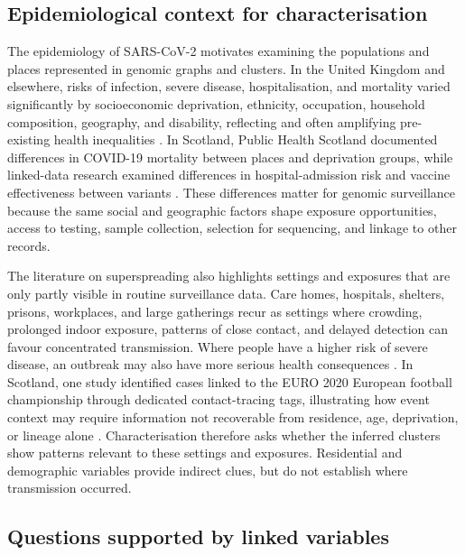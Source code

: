 \subsection{Epidemiological context for characterisation}\label{sec:ch2_population_place_context}

The epidemiology of SARS-CoV-2 motivates examining the populations and places represented in genomic graphs and clusters. In the United Kingdom and elsewhere, risks of infection, severe disease, hospitalisation, and mortality varied significantly by socioeconomic deprivation, ethnicity, occupation, household composition, geography, and disability, reflecting and often amplifying pre-existing health inequalities \citep{Bambra2020,Niedzwiedz2020,Mathur2021,Whitehead2021,Marmot2020}. In Scotland, Public Health Scotland documented differences in COVID-19 mortality between places and deprivation groups, while linked-data research examined differences in hospital-admission risk and vaccine effectiveness between variants \citep{PublicHealthScotland2020,Sheikh2021}. These differences matter for genomic surveillance because the same social and geographic factors shape exposure opportunities, access to testing, sample collection, selection for sequencing, and linkage to other records.

The literature on superspreading also highlights settings and exposures that are only partly visible in routine surveillance data. Care homes, hospitals, shelters, prisons, workplaces, and large gatherings recur as settings where crowding, prolonged indoor exposure, patterns of close contact, and delayed detection can favour concentrated transmission. Where people have a higher risk of severe disease, an outbreak may also have more serious health consequences \citep{Althouse2020,Meredith2020,Hamilton2021,Aggarwal2022,Lemieux2021,McKee2024}. In Scotland, one study identified cases linked to the EURO 2020 European football championship through dedicated contact-tracing tags, illustrating how event context may require information not recoverable from residence, age, deprivation, or lineage alone \citep{Marsh2021}. Characterisation therefore asks whether the inferred clusters show patterns relevant to these settings and exposures. Residential and demographic variables provide indirect clues, but do not establish where transmission occurred.

\subsection{Questions supported by linked variables}\label{sec:ch2_contextual_variables}

